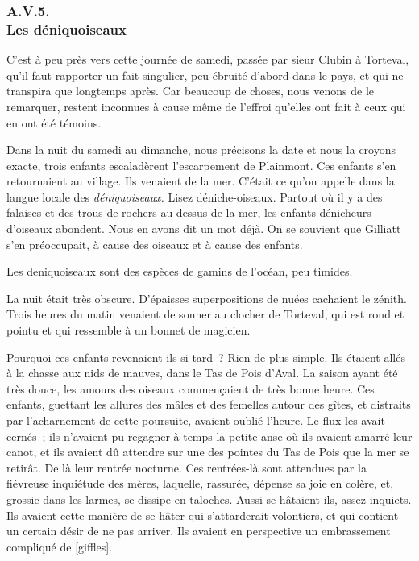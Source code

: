 \documentclass[french,twoside]{book} %
\newcommand\corr[1]{#1}
\begin{document}
 \subsubsection[{A.V.5. Les déniquoiseaux}]{A.V.5. \\
Les déniquoiseaux}
\noindent C’est à peu près vers cette journée de samedi, passée par sieur Clubin à Torteval, qu’il faut rapporter un fait singulier, peu ébruité d’abord dans le pays, et qui ne transpira que longtemps après. Car beaucoup de choses, nous venons de le remarquer, restent inconnues à cause même de l’effroi qu’elles ont fait à ceux qui en ont été témoins.\par
Dans la nuit du samedi au dimanche, nous précisons la date et nous la croyons exacte, trois enfants escaladèrent l’escarpement de Plainmont. Ces enfants s’en retournaient au village. Ils venaient de la mer. C’était ce qu’on appelle dans la langue locale des \emph{déniquoiseaux.} Lisez déniche-oiseaux. Partout où il y a des falaises et des trous de rochers au-dessus de la mer, les enfants dénicheurs d’oiseaux abondent. Nous en avons dit un mot déjà. On se souvient que Gilliatt s’en préoccupait, à cause des oiseaux et à cause des enfants.\par
 Les deniquoiseaux sont des espèces de gamins de l’océan, peu timides.\par
La nuit était très obscure. D’épaisses superpositions de nuées cachaient le zénith. Trois heures du matin venaient de sonner au clocher de Torteval, qui est rond et pointu et qui ressemble à un bonnet de magicien.\par
Pourquoi ces enfants revenaient-ils si tard ? Rien de plus simple. Ils étaient allés à la chasse aux nids de mauves, dans le Tas de Pois d’Aval. La saison ayant été très douce, les amours des oiseaux commençaient de très bonne heure. Ces enfants, guettant les allures des mâles et des femelles autour des gîtes, et distraits par l’acharnement de cette poursuite, avaient oublié l’heure. Le flux les avait cernés ; ils n’avaient pu regagner à temps la petite anse où ils avaient amarré leur canot, et ils avaient dû attendre sur une des pointes du Tas de Pois que la mer se retirât. De là leur rentrée nocturne. Ces rentrées-là sont attendues par la fiévreuse inquiétude des mères, laquelle, rassurée, dépense sa joie en colère, et, grossie dans les larmes, se dissipe en taloches. Aussi se hâtaient-ils, assez inquiets. Ils avaient cette manière de se hâter qui s’attarderait volontiers, et qui contient un certain désir de ne pas arriver. Ils avaient en perspective un embrassement compliqué de [{\corr giffles}].\par
\end{document}
